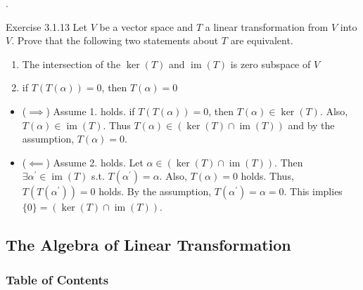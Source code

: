 \documentclass[8pt]{beamer}
\newcommand{\im}{\operatorname{im}}
\begin{document}
\begin{frame}{.}
    \begin{block}{Exercise 3.1.13}
        Let $V$ be a vector space and $T$ a linear transformation from $V$ into $V$. Prove that the following two statements about $T$ are equivalent.
        \begin{enumerate}
            \item The intersection of the $\ker(T)$ and $\im(T)$ is zero subspace of $V$
            \item if $T(T(\alpha)) = 0$, then $T(\alpha) = 0$
        \end{enumerate}
    \end{block}
    \begin{itemize}
        \item ($\implies$) Assume 1. holds. if $T(T(\alpha)) = 0$, then $T(\alpha) \in \ker (T)$. Also, $T(\alpha) \in \im(T)$. Thus $T(\alpha) \in (\ker(T) \cap \im(T))$ and by the assumption, $T(\alpha) = 0$.
        \item ($\impliedby$) Assume 2. holds. Let $\alpha \in (\ker(T) \cap \im(T))$. Then $\exists \alpha^\prime \in \im(T)$ s.t. $T(\alpha^\prime) = \alpha$. Also, $T(\alpha) = 0$ holds. Thus, $T(T(\alpha^\prime)) =0$ holds. By the assumption, $T(\alpha^\prime) = \alpha = 0$.
        This implies $\{0\} = (\ker(T) \cap \im(T))$.
    \end{itemize}
\end{frame}

\subsection{The Algebra of Linear Transformation}

\begingroup
    \begin{frame}
        \frametitle{Table of Contents}
        \tableofcontents[currentsubsection]
    \end{frame}
\endgroup
\end{document}
